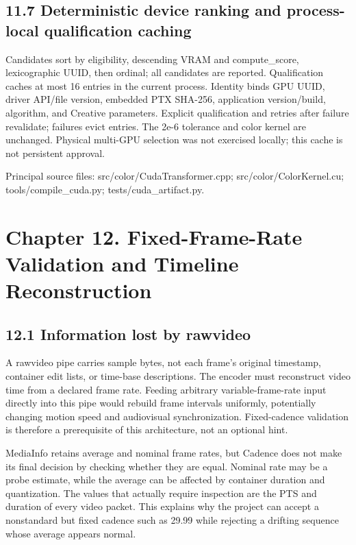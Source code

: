 \documentclass[11pt,a4paper,openany]{book}
\begin{document}
\section*{11.7 Deterministic device ranking and process-local qualification caching}
Candidates sort by eligibility, descending VRAM and compute\_score, lexicographic UUID, then ordinal; all candidates are reported. Qualification caches at most 16 entries in the current process. Identity binds GPU UUID, driver API/file version, embedded PTX SHA-256, application version/build, algorithm, and Creative parameters. Explicit qualification and retries after failure revalidate; failures evict entries. The 2e-6 tolerance and color kernel are unchanged. Physical multi-GPU selection was not exercised locally; this cache is not persistent approval.


\par\small Principal source files: src/color/CudaTransformer.cpp; src/color/ColorKernel.cu; tools/compile\_cuda.py; tests/cuda\_artifact.py.\normalsize

\chapter*{Chapter 12. Fixed-Frame-Rate Validation and Timeline Reconstruction}

\section*{12.1 Information lost by rawvideo}
A rawvideo pipe carries sample bytes, not each frame's original timestamp, container edit lists, or time-base descriptions. The encoder must reconstruct video time from a declared frame rate. Feeding arbitrary variable-frame-rate input directly into this pipe would rebuild frame intervals uniformly, potentially changing motion speed and audiovisual synchronization. Fixed-cadence validation is therefore a prerequisite of this architecture, not an optional hint.

MediaInfo retains average and nominal frame rates, but Cadence does not make its final decision by checking whether they are equal. Nominal rate may be a probe estimate, while the average can be affected by container duration and quantization. The values that actually require inspection are the PTS and duration of every video packet. This explains why the project can accept a nonstandard but fixed cadence such as 29.99 while rejecting a drifting sequence whose average appears normal.
\end{document}
